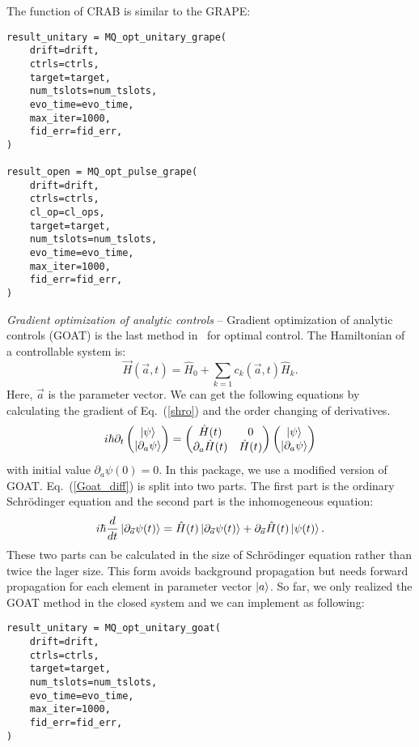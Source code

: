 The function of CRAB is similar to the GRAPE:
\begin{lstlisting}
result_unitary = MQ_opt_unitary_grape(
    drift=drift,
    ctrls=ctrls,
    target=target,
    num_tslots=num_tslots,
    evo_time=evo_time,
    max_iter=1000,
    fid_err=fid_err,
)

result_open = MQ_opt_pulse_grape(
    drift=drift,
    ctrls=ctrls,
    cl_op=cl_ops,
    target=target,
    num_tslots=num_tslots,
    evo_time=evo_time,
    max_iter=1000,
    fid_err=fid_err,
)
\end{lstlisting}

\textit{Gradient optimization of analytic controls} -- Gradient optimization of analytic controls (GOAT) is the last method in \MindQuantum\ for optimal control. The Hamiltonian of a controllable system is:
\begin{equation}
    \vec{H}(\vec{a},t)=\hat{H}_{0}+\sum_{k=1}c_{k}(\vec{a},t)\hat{H}_{k}.
\end{equation}
Here, $\vec{a}$ is the parameter vector. We can get the following equations by calculating the gradient of Eq.~(\ref{shro}) and the order changing of derivatives.
\begin{equation}
    i\hbar\partial_{t}
    \begin{pmatrix}
        \ket{\psi} \\
        \ket{\partial_{a}\psi}
    \end{pmatrix}
    =
    \begin{pmatrix}
        \hat{H}(t)             & 0          \\
        \partial_{a}\hat{H}(t) & \hat{H}(t)
    \end{pmatrix}
    \begin{pmatrix}
        \ket{\psi} \\
        \ket{\partial_{a}\psi}
    \end{pmatrix}
    \label{Goat_diff}
\end{equation}
with initial value $\partial_{a}\psi(0)=0$. In this package, we use a modified version of GOAT. Eq.~(\ref{Goat_diff}) is split into two parts. The first part is the ordinary Schrödinger equation and the second part is the inhomogeneous equation:
\begin{equation}
    i\hbar\frac{d}{dt}\ket{\partial_{\vec{a}}\psi(t)}=\hat{H}(t)\ket{\partial_{\vec{a}}\psi(t)}+\partial_{\vec{a}}\hat{H}(t)\ket{\psi(t)}.
\end{equation}
These two parts can be calculated in the size of Schrödinger equation rather than twice the lager size. This form avoids background propagation but needs forward propagation for each element in parameter vector $\ket{a}$. So far, we only realized the GOAT method in the closed system and we can implement as following:
\begin{lstlisting}
result_unitary = MQ_opt_unitary_goat(
    drift=drift,
    ctrls=ctrls,
    target=target,
    num_tslots=num_tslots,
    evo_time=evo_time,
    max_iter=1000,
    fid_err=fid_err,
)
\end{lstlisting}
